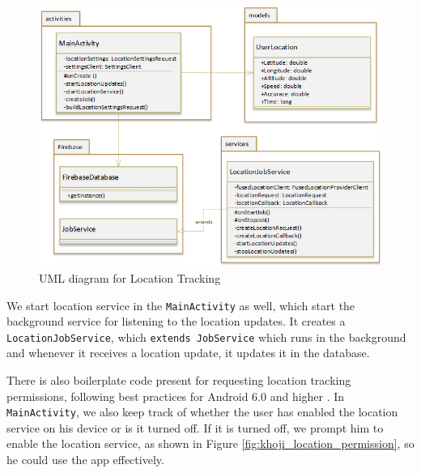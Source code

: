 \begin{figure}[H]
    \centering
        \includegraphics[width=1.00\textwidth]{images/uml-location.png}
    \caption{UML diagram for Location Tracking}
    \label{fig:uml-location}
\end{figure}

We start location service in the \texttt{MainActivity} as well, which start the background service for listening to the location updates. It creates a \texttt{LocationJobService}, which \texttt{extends JobService} which runs in the background and whenever it receives a location update, it updates it in the database.

There is also boilerplate code present for requesting location tracking permissions, following best practices for Android 6.0 and higher \cite{AndroidPermissions2018}. In \texttt{MainActivity}, we also keep track of whether the user has enabled the location service on his device or is it turned off. If it is turned off, we prompt him to enable the location service, as shown in Figure \ref{fig:khoji_location_permission}, so he could use the app effectively.

